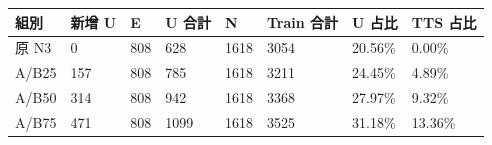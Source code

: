 \begin{tabular}{llllllll}
\toprule
組別 & 新增 U & E & U 合計 & N & Train 合計 & U 占比 & TTS 占比\\
\midrule
原 N3 & 0 & 808 & 628 & 1618 & 3054 & 20.56\% & 0.00\%\\
A/B25 & 157 & 808 & 785 & 1618 & 3211 & 24.45\% & 4.89\%\\
A/B50 & 314 & 808 & 942 & 1618 & 3368 & 27.97\% & 9.32\%\\
A/B75 & 471 & 808 & 1099 & 1618 & 3525 & 31.18\% & 13.36\%\\
\bottomrule
\end{tabular}
